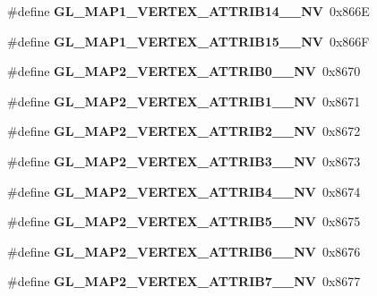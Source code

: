 \begin{DoxyCompactItemize}
\item 
\#define {\bfseries G\+L\+\_\+\+M\+A\+P1\+\_\+\+V\+E\+R\+T\+E\+X\+\_\+\+A\+T\+T\+R\+I\+B14\+\_\+\_\+\+N\+V}~0x866\+E\label{_s_d_l__opengl_8h_acfcfd02a67755dc57789960ad4fa4ad8}

\item 
\#define {\bfseries G\+L\+\_\+\+M\+A\+P1\+\_\+\+V\+E\+R\+T\+E\+X\+\_\+\+A\+T\+T\+R\+I\+B15\+\_\+\_\+\+N\+V}~0x866\+F\label{_s_d_l__opengl_8h_a42d4b8efdf7f2127f7b4cbda1c98cf62}

\item 
\#define {\bfseries G\+L\+\_\+\+M\+A\+P2\+\_\+\+V\+E\+R\+T\+E\+X\+\_\+\+A\+T\+T\+R\+I\+B0\+\_\+\_\+\+N\+V}~0x8670\label{_s_d_l__opengl_8h_a88a130b8af32cea0734636d9c7079759}

\item 
\#define {\bfseries G\+L\+\_\+\+M\+A\+P2\+\_\+\+V\+E\+R\+T\+E\+X\+\_\+\+A\+T\+T\+R\+I\+B1\+\_\+\_\+\+N\+V}~0x8671\label{_s_d_l__opengl_8h_abba3d2e80643ab245bdca062223689af}

\item 
\#define {\bfseries G\+L\+\_\+\+M\+A\+P2\+\_\+\+V\+E\+R\+T\+E\+X\+\_\+\+A\+T\+T\+R\+I\+B2\+\_\+\_\+\+N\+V}~0x8672\label{_s_d_l__opengl_8h_a4e3e47130fa8c1b06437bfc6dfc66fc3}

\item 
\#define {\bfseries G\+L\+\_\+\+M\+A\+P2\+\_\+\+V\+E\+R\+T\+E\+X\+\_\+\+A\+T\+T\+R\+I\+B3\+\_\+\_\+\+N\+V}~0x8673\label{_s_d_l__opengl_8h_ab7e677149731afde7fe29999abd28e88}

\item 
\#define {\bfseries G\+L\+\_\+\+M\+A\+P2\+\_\+\+V\+E\+R\+T\+E\+X\+\_\+\+A\+T\+T\+R\+I\+B4\+\_\+\_\+\+N\+V}~0x8674\label{_s_d_l__opengl_8h_ab63fbd2dc7d6c60e3fc78c2fb0c66e98}

\item 
\#define {\bfseries G\+L\+\_\+\+M\+A\+P2\+\_\+\+V\+E\+R\+T\+E\+X\+\_\+\+A\+T\+T\+R\+I\+B5\+\_\+\_\+\+N\+V}~0x8675\label{_s_d_l__opengl_8h_ac493cec6642a7193e883504f6033b286}

\item 
\#define {\bfseries G\+L\+\_\+\+M\+A\+P2\+\_\+\+V\+E\+R\+T\+E\+X\+\_\+\+A\+T\+T\+R\+I\+B6\+\_\+\_\+\+N\+V}~0x8676\label{_s_d_l__opengl_8h_a120155996331fb6e5db67b61e64a5e35}

\item 
\#define {\bfseries G\+L\+\_\+\+M\+A\+P2\+\_\+\+V\+E\+R\+T\+E\+X\+\_\+\+A\+T\+T\+R\+I\+B7\+\_\+\_\+\+N\+V}~0x8677\label{_s_d_l__opengl_8h_ae65522a4f40973bff20aee5d4c17abcd}


\end{DoxyCompactItemize}
